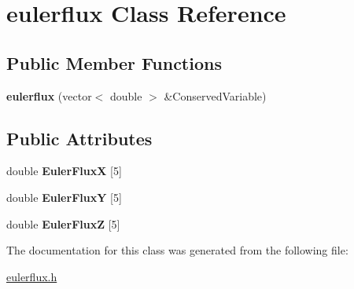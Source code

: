 \hypertarget{classeulerflux}{}\section{eulerflux Class Reference}
\label{classeulerflux}
\subsection*{Public Member Functions}
\begin{DoxyCompactItemize}
\item 
{\bfseries eulerflux} (vector$<$ double $>$ \&Conserved\+Variable)\hypertarget{classeulerflux_a184f13dbf2a62b11c443688049c1f4db}{}\label{classeulerflux_a184f13dbf2a62b11c443688049c1f4db}

\end{DoxyCompactItemize}
\subsection*{Public Attributes}
\begin{DoxyCompactItemize}
\item 
double {\bfseries Euler\+FluxX} \mbox{[}5\mbox{]}\hypertarget{classeulerflux_a0282624fae997ac54441271130497185}{}\label{classeulerflux_a0282624fae997ac54441271130497185}

\item 
double {\bfseries Euler\+FluxY} \mbox{[}5\mbox{]}\hypertarget{classeulerflux_afdebc952e09629e73d7dcdda3e9e60ce}{}\label{classeulerflux_afdebc952e09629e73d7dcdda3e9e60ce}

\item 
double {\bfseries Euler\+FluxZ} \mbox{[}5\mbox{]}\hypertarget{classeulerflux_aaf2a28c94cb1cad57800342f8496c4b2}{}\label{classeulerflux_aaf2a28c94cb1cad57800342f8496c4b2}

\end{DoxyCompactItemize}


The documentation for this class was generated from the following file\+:\begin{DoxyCompactItemize}
\item 
\hyperlink{eulerflux_8h}{eulerflux.\+h}\end{DoxyCompactItemize}
